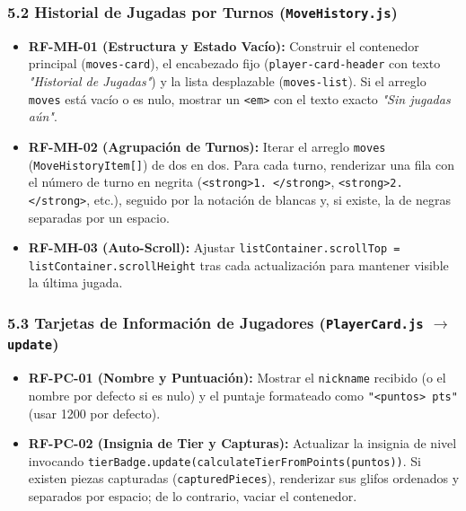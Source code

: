 \documentclass[10pt,letterpaper]{article}
\begin{document}
\subsubsection*{5.2 Historial de Jugadas por Turnos (\texttt{MoveHistory.js})}
\begin{itemize}[leftmargin=*,itemsep=1.5pt]
    \item \textbf{RF-MH-01 (Estructura y Estado Vacío):} Construir el contenedor principal (\lstinline|moves-card|), el encabezado fijo (\lstinline|player-card-header| con texto \textit{"Historial de Jugadas"}) y la lista desplazable (\lstinline|moves-list|). Si el arreglo \texttt{moves} está vacío o es nulo, mostrar un \lstinline|<em>| con el texto exacto \textit{"Sin jugadas aún"}.
    \item \textbf{RF-MH-02 (Agrupación de Turnos):} Iterar el arreglo \texttt{moves} (\texttt{MoveHistoryItem[]}) de dos en dos. Para cada turno, renderizar una fila con el número de turno en negrita (\lstinline|<strong>1. </strong>|, \lstinline|<strong>2. </strong>|, etc.), seguido por la notación de blancas y, si existe, la de negras separadas por un espacio.
    \item \textbf{RF-MH-03 (Auto-Scroll):} Ajustar \lstinline|listContainer.scrollTop = listContainer.scrollHeight| tras cada actualización para mantener visible la última jugada.
\end{itemize}

\subsubsection*{5.3 Tarjetas de Información de Jugadores (\texttt{PlayerCard.js} $\rightarrow$ \texttt{update})}
\begin{itemize}[leftmargin=*,itemsep=1.5pt]
    \item \textbf{RF-PC-01 (Nombre y Puntuación):} Mostrar el \texttt{nickname} recibido (o el nombre por defecto si es nulo) y el puntaje formateado como \lstinline|"<puntos> pts"| (usar 1200 por defecto).
    \item \textbf{RF-PC-02 (Insignia de Tier y Capturas):} Actualizar la insignia de nivel invocando \lstinline|tierBadge.update(calculateTierFromPoints(puntos))|. Si existen piezas capturadas (\texttt{capturedPieces}), renderizar sus glifos ordenados y separados por espacio; de lo contrario, vaciar el contenedor.
\end{itemize}
\end{document}

